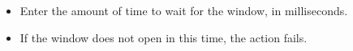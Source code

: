 \begin{itemize}
\item Enter the amount of time to wait for the window, in milliseconds.
\item If the window does not open in this time, the action fails.
\end{itemize}

